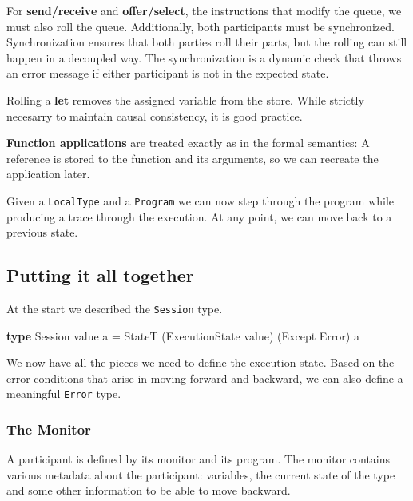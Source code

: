 \documentclass[runningheads]{llncs}
\newenvironment{Shaded}{}{}
\newcommand{\KeywordTok}[1]{\textcolor[rgb]{0.00,0.44,0.13}{\textbf{#1}}}
\newcommand{\DataTypeTok}[1]{\textcolor[rgb]{0.56,0.13,0.00}{#1}}
\newcommand{\FunctionTok}[1]{\textcolor[rgb]{0.02,0.16,0.49}{#1}}
\newcommand{\NormalTok}[1]{#1}
\begin{document}
For \textbf{send/receive} and \textbf{offer/select}, the instructions
that modify the queue, we must also roll the queue. Additionally, both
participants must be synchronized. Synchronization ensures that both
parties roll their parts, but the rolling can still happen in a
decoupled way. The synchronization is a dynamic check that throws an
error message if either participant is not in the expected state.

Rolling a \textbf{let} removes the assigned variable from the store.
While strictly necesarry to maintain causal consistency, it is good
practice.

\textbf{Function applications} are treated exactly as in the formal
semantics: A reference is stored to the function and its arguments, so
we can recreate the application later.

Given a \texttt{LocalType} and a \texttt{Program} we can now step
through the program while producing a trace through the execution. At
any point, we can move back to a previous state.

\subsection{Putting it all together}\label{putting-it-all-together}

At the start we described the \texttt{Session} type.

\begin{Shaded}
\begin{Highlighting}[]
\KeywordTok{type} \DataTypeTok{Session}\NormalTok{ value a }\FunctionTok{=} 
    \DataTypeTok{StateT}\NormalTok{ (}\DataTypeTok{ExecutionState}\NormalTok{ value) (}\DataTypeTok{Except} \DataTypeTok{Error}\NormalTok{) a}
\end{Highlighting}
\end{Shaded}

We now have all the pieces we need to define the execution state. Based
on the error conditions that arise in moving forward and backward, we
can also define a meaningful \texttt{Error} type.

\subsubsection{The Monitor}\label{the-monitor}

A participant is defined by its monitor and its program. The monitor
contains various metadata about the participant: variables, the current
state of the type and some other information to be able to move
backward.
\end{document}
